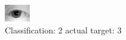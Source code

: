 \begin{figure}[h!]
\begin{center}
\includegraphics[width=0.60\columnwidth]{figures/ID1082_class_2_target_3.png}
\end{center}
\caption{ Classification: 2 actual target: 3}
\label{fig:ID1082_class_2_target_3}
\end{figure}
